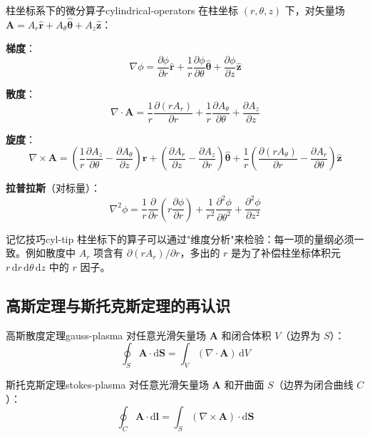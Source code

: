 \documentclass[12pt,a4paper,openany,oneside]{book}
\newcommand{\diff}{\mathrm{d}}
\newcommand{\vect}[1]{\bm{#1}}
\newcommand{\unitvec}[1]{\hat{\vect{#1}}}
\newcommand{\grad}{\nabla}
\newcommand{\curl}{\nabla\times}
\newcommand{\divg}{\nabla\cdot}
\newcommand{\lap}{\nabla^2}
\begin{document}
\begin{theorem}{柱坐标系下的微分算子}{cylindrical-operators}
在柱坐标 $(r,\theta,z)$ 下，对矢量场 $\vect{A} = A_r\unitvec{r} + A_\theta\unitvec{\theta} + A_z\unitvec{z}$：

\textbf{梯度}：
\[
\grad\phi = \frac{\partial\phi}{\partial r}\unitvec{r} + \frac{1}{r}\frac{\partial\phi}{\partial\theta}\unitvec{\theta} + \frac{\partial\phi}{\partial z}\unitvec{z}
\]

\textbf{散度}：
\[
\divg\vect{A} = \frac{1}{r}\frac{\partial(rA_r)}{\partial r} + \frac{1}{r}\frac{\partial A_\theta}{\partial\theta} + \frac{\partial A_z}{\partial z}
\]

\textbf{旋度}：
\[
\curl\vect{A} = \left(\frac{1}{r}\frac{\partial A_z}{\partial\theta} - \frac{\partial A_\theta}{\partial z}\right)\unitvec{r} + \left(\frac{\partial A_r}{\partial z} - \frac{\partial A_z}{\partial r}\right)\unitvec{\theta} + \frac{1}{r}\left(\frac{\partial(rA_\theta)}{\partial r} - \frac{\partial A_r}{\partial\theta}\right)\unitvec{z}
\]

\textbf{拉普拉斯}（对标量）：
\[
\lap\phi = \frac{1}{r}\frac{\partial}{\partial r}\left(r\frac{\partial\phi}{\partial r}\right) + \frac{1}{r^2}\frac{\partial^2\phi}{\partial\theta^2} + \frac{\partial^2\phi}{\partial z^2}
\]
\end{theorem}

\begin{tip}{记忆技巧}{cyl-tip}
柱坐标下的算子可以通过"维度分析"来检验：每一项的量纲必须一致。例如散度中 $A_r$ 项含有 $\partial(rA_r)/\partial r$，多出的 $r$ 是为了补偿柱坐标体积元 $r\,\diff r\,\diff\theta\,\diff z$ 中的 $r$ 因子。
\end{tip}

\subsection{高斯定理与斯托克斯定理的再认识}

\begin{theorem}{高斯散度定理}{gauss-plasma}
对任意光滑矢量场 $\vect{A}$ 和闭合体积 $V$（边界为 $S$）：
\[
\oint_S \vect{A}\cdot\diff\vect{S} = \int_V (\divg\vect{A})\,\diff V
\]
\end{theorem}

\begin{theorem}{斯托克斯定理}{stokes-plasma}
对任意光滑矢量场 $\vect{A}$ 和开曲面 $S$（边界为闭合曲线 $C$）：
\[
\oint_C \vect{A}\cdot\diff\vect{l} = \int_S (\curl\vect{A})\cdot\diff\vect{S}
\]
\end{theorem}
\end{document}
